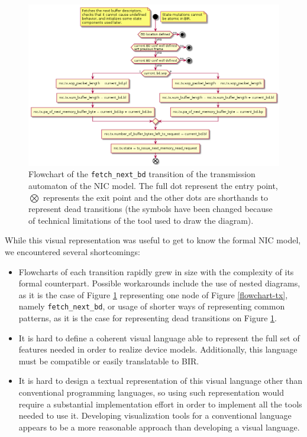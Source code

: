\documentclass{kththesis}
\begin{document}
{\begin{figure}[p]
	\includegraphics[width=\textwidth]{figures/flowchart-tx_fetch_next_bd.png}
	\centering
	\caption{Flowchart of the \texttt{fetch\_next\_bd} transition of the transmission automaton of the NIC model. The full dot represent the entry point, $\bigotimes$ represents the exit point and the other dots are shorthands to represent dead transitions (the symbols have been changed because of technical limitations of the tool used to draw the diagram).}
	\label{flowchart-tx_fetch_next_bd}
\end{figure}

While this visual representation was useful to get to know the formal NIC model, we encountered several shortcomings:

\begin{itemize}
    \item Flowcharts of each transition rapidly grew in size with the complexity of its formal counterpart. Possible workarounds include the use of nested diagrams, as it is the case of Figure \ref{flowchart-tx_fetch_next_bd} representing one node of Figure \ref{flowchart-tx}, namely \texttt{fetch\_next\_bd}, or usage of shorter ways of representing common patterns, as it is the case for representing dead transitions on Figure \ref{flowchart-tx_fetch_next_bd}.
    \item It is hard to define a coherent visual language able to represent the full set of features needed in order to realize device models. Additionally, this language must be compatible or easily translatable to BIR.
    \item It is hard to design a textual representation of this visual language other than conventional programming languages, so using such representation would require a substantial implementation effort in order to implement all the tools needed to use it. Developing visualization tools for a conventional language appears to be a more reasonable approach than developing a visual language.
\end{itemize}

}
\end{document}
